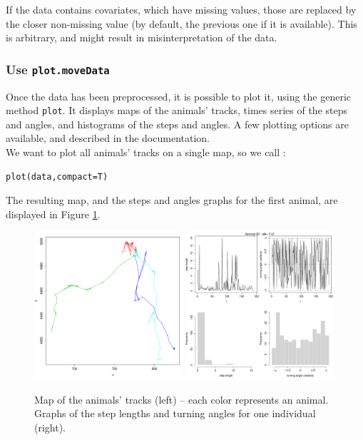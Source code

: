 \documentclass[]{article}
\begin{document}
If the data contains covariates, which have missing values, those are replaced by the closer non-missing value (by default, the previous one if it is available). This is arbitrary, and might result in misinterpretation of the data.

\subsubsection{Use \texttt{plot.moveData}}
Once the data has been preprocessed, it is possible to plot it, using the generic method \texttt{plot}. It displays maps of the animals' tracks, times series of the steps and angles, and histograms of the steps and angles. A few plotting options are available, and described in the documentation.\\

\noindent We want to plot all animals' tracks on a single map, so we call :

\begin{lstlisting}
plot(data,compact=T)
\end{lstlisting}

The resulting map, and the steps and angles graphs for the first animal, are displayed in Figure \ref{moveData}.

\begin{figure}[h]
	\includegraphics[width=0.49\textwidth]{pictures/map_moveData}
	\includegraphics[width=0.49\textwidth]{pictures/graphs_elk1}
	\caption{Map of the animals' tracks (left) -- each color represents an animal. Graphs of the step lengths and turning angles for one individual (right).}
	\label{moveData}
\end{figure}
\end{document}
